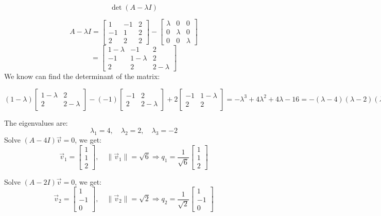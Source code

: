 \documentclass[12pt]{article}
\begin{document}
\begin{enumerate}[leftmargin=0em]
    \[\det(A - \lambda I) \]
    
    \[ A - \lambda I = \begin{bmatrix}
    1 & -1 & 2 \\
    -1 & 1 & 2 \\
    2 & 2 & 2
    \end{bmatrix}
    -
    \begin{bmatrix}
        \lambda & 0 & 0 \\
        0 & \lambda & 0 \\
        0 & 0 & \lambda
    \end{bmatrix}
    \]
    \[
    = \begin{bmatrix}
        1 - \lambda & -1 & 2 \\
        -1 & 1-\lambda & 2 \\
        2 & 2 & 2-\lambda
    \end{bmatrix}
    \]
    We know can find the determinant of the matrix:
    
    \[(1-\lambda)
    \begin{bmatrix}
    1-\lambda & 2 \\
    2 & 2-\lambda
    \end{bmatrix}
    -(-1)
    \begin{bmatrix}
        -1 & 2 \\
        2 & 2-\lambda
    \end{bmatrix}
    +2 \begin{bmatrix}
        -1 & 1-\lambda \\
        2 & 2
    \end{bmatrix} 
    = 
    -\lambda^{3} + 4\lambda^{2}+4\lambda-16 = -(\lambda - 4)(\lambda - 2)(\lambda + 2)
    \]
    
    The eigenvalues are:
    \[
    \lambda_1 = 4, \quad \lambda_2 = 2, \quad \lambda_3 = -2
    \]
    Solve \( (A - 4I)\vec{v} = 0 \), we get:
    \[
    \vec{v}_1 = \begin{bmatrix} 1 \\ 1 \\ 2 \end{bmatrix}, \quad
    \|\vec{v}_1\| = \sqrt{6}
    \Rightarrow
    q_1 = \frac{1}{\sqrt{6}} \begin{bmatrix} 1 \\ 1 \\ 2 \end{bmatrix}
    \]
    
    Solve \( (A - 2I)\vec{v} = 0 \), we get:
    \[
    \vec{v}_2 = \begin{bmatrix} 1 \\ -1 \\ 0 \end{bmatrix}, \quad
    \|\vec{v}_2\| = \sqrt{2}
    \Rightarrow
    q_2 = \frac{1}{\sqrt{2}} \begin{bmatrix} 1 \\ -1 \\ 0 \end{bmatrix}
    \]
    

\end{enumerate}
\end{document}
